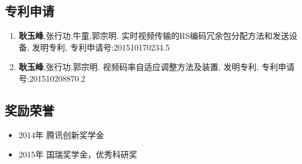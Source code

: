 \subsection*{专利申请}
\newitemsep
{\typebib
\begin{enumerate}
    \item \textbf{耿玉峰},张行功,牛童,郭宗明. 实时视频传输的RS编码冗余包分配方法和发送设备, 发明专利, 专利申请号:201510170234.5
    \item \textbf{耿玉峰},张行功,郭宗明. 视频码率自适应调整方法及装置, 发明专利, 专利申请号:201510208870.2
\end{enumerate}
}

\subsection*{奖励荣誉}
\newitemsep
{\typebib
\begin{itemize}
    \item 2014年 \quad 腾讯创新奖学金
    \item 2015年 \quad 国瑞奖学金，优秀科研奖
\end{itemize}
}
